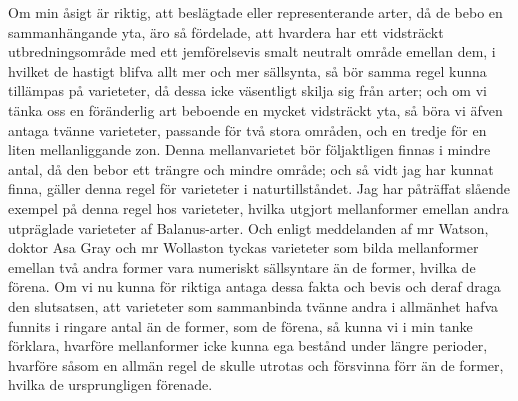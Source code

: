 Om min åsigt är riktig, att beslägtade eller representerande arter, då de bebo en sammanhängande yta, äro så fördelade, att hvardera har ett vidsträckt utbredningsområde med ett jemförelsevis smalt neutralt område emellan dem, i hvilket de hastigt blifva allt mer och mer sällsynta, så bör samma regel kunna tillämpas på varieteter, då dessa icke väsentligt skilja sig från arter; och om vi tänka oss en föränderlig art beboende en mycket vidsträckt yta, så böra vi äfven antaga tvänne varieteter, passande för två stora områden, och en tredje för en liten mellanliggande zon. Denna mellanvarietet bör följaktligen finnas i mindre antal, då den bebor ett trängre och mindre område; och så vidt jag har kunnat finna, gäller denna regel för varieteter i naturtillståndet. Jag har påträffat slående exempel på denna regel hos varieteter, hvilka utgjort mellanformer emellan andra utpräglade varieteter af Balanus-arter. Och enligt meddelanden af mr Watson, doktor Asa Gray och mr Wollaston tyckas varieteter som bilda mellanformer emellan två andra former vara numeriskt sällsyntare än de former, hvilka de förena. Om vi nu kunna för riktiga antaga dessa fakta och bevis och deraf draga den slutsatsen, att varieteter som sammanbinda tvänne andra i allmänhet hafva funnits i ringare antal än de former, som de förena, så kunna vi i min tanke förklara, hvarföre mellanformer icke kunna ega bestånd under längre perioder, hvarföre såsom en allmän regel de skulle utrotas och försvinna förr än de former, hvilka de ursprungligen förenade.

